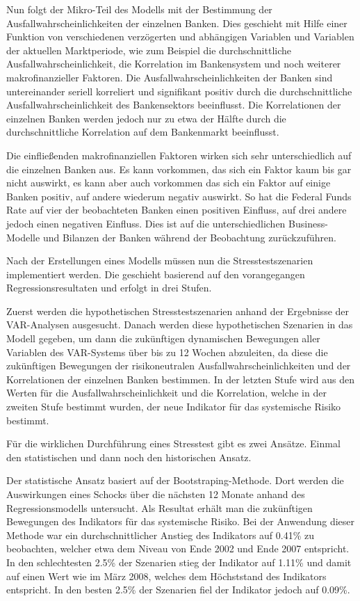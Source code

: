 \documentclass[a4paper,12pt]{scrartcl}
\begin{document}
Nun folgt der Mikro-Teil des Modells mit der Bestimmung der Ausfallwahrscheinlichkeiten der einzelnen Banken. Dies geschieht mit Hilfe einer Funktion von verschiedenen verzögerten und abhängigen Variablen und Variablen der aktuellen Marktperiode, wie zum Beispiel die durchschnittliche Ausfallwahrscheinlichkeit, die Korrelation im Bankensystem und noch weiterer makrofinanzieller Faktoren.
Die Ausfallwahrscheinlichkeiten der Banken sind untereinander seriell korreliert und signifikant positiv durch die durchschnittliche Ausfallwahrscheinlichkeit des Bankensektors beeinflusst. Die Korrelationen der einzelnen Banken werden jedoch nur zu etwa der Hälfte durch die durchschnittliche Korrelation auf dem Bankenmarkt beeinflusst.


Die einfließenden makrofinanziellen Faktoren wirken sich sehr unterschiedlich auf die einzelnen Banken aus. Es kann vorkommen, das sich ein Faktor kaum bis gar nicht auswirkt, es kann aber auch vorkommen das sich ein Faktor auf einige Banken positiv, auf andere wiederum negativ auswirkt. So hat die Federal Funds Rate auf vier der beobachteten Banken einen positiven Einfluss, auf drei andere jedoch einen negativen Einfluss. Dies ist auf die unterschiedlichen Business-Modelle und Bilanzen der Banken während der Beobachtung zurückzuführen. 

Nach der Erstellungen eines Modells müssen nun die Stresstestszenarien implementiert werden.
Die geschieht basierend auf den vorangegangen Regressionsresultaten und erfolgt in drei Stufen.

Zuerst werden die hypothetischen Stresstestszenarien anhand der Ergebnisse der VAR-Analysen ausgesucht.
Danach werden diese hypothetischen Szenarien in das Modell gegeben, um dann die zukünftigen dynamischen Bewegungen aller Variablen des VAR-Systems über bis zu 12 Wochen abzuleiten, da diese die zukünftigen Bewegungen der risikoneutralen Ausfallwahrscheinlichkeiten und der Korrelationen der einzelnen Banken bestimmen. 
In der letzten Stufe wird aus den Werten für die Ausfallwahrscheinlichkeit und die Korrelation, welche in der zweiten Stufe bestimmt wurden, der neue Indikator für das systemische Risiko bestimmt.


Für die wirklichen Durchführung eines Stresstest gibt es zwei Ansätze. Einmal den statistischen und dann noch den historischen Ansatz.

Der statistische Ansatz basiert auf der Bootstraping-Methode. Dort werden die Auswirkungen eines Schocks über die nächsten 12 Monate anhand des Regressionsmodells untersucht. Als Resultat erhält man die zukünftigen Bewegungen des Indikators für das systemische Risiko.
Bei der Anwendung dieser Methode war ein durchschnittlicher Anstieg des Indikators auf 0.41\% zu beobachten, welcher etwa dem Niveau von Ende 2002 und Ende 2007 entspricht. In den schlechtesten 2.5\% der Szenarien stieg der Indikator auf 1.11\% und damit auf einen Wert wie im März 2008, welches dem Höchststand des Indikators entspricht. In den besten 2.5\% der Szenarien fiel der Indikator jedoch auf 0.09\%.
\end{document}

